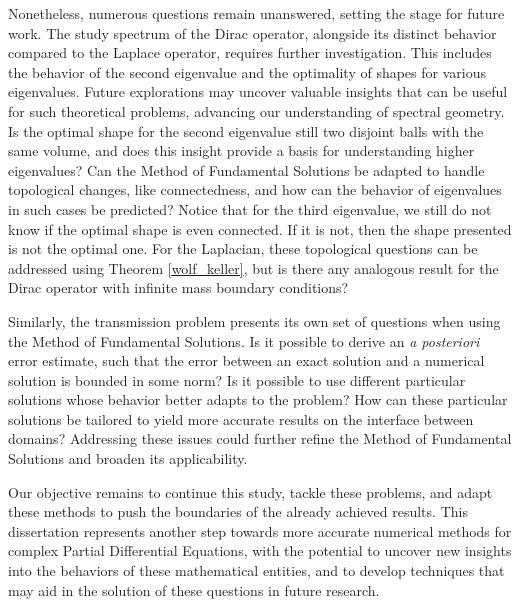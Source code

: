 Nonetheless, numerous questions remain unanswered, setting the stage for future work. The study spectrum of the Dirac operator, alongside its distinct behavior compared to the Laplace operator, requires further investigation. This includes the behavior of the second eigenvalue and the optimality of shapes for various eigenvalues. Future explorations may uncover valuable insights that can be useful for such theoretical problems, advancing our understanding of spectral geometry. Is the optimal shape for the second eigenvalue still two disjoint balls with the same volume, and does this insight provide a basis for understanding higher eigenvalues? Can the Method of Fundamental Solutions be adapted to handle topological changes, like connectedness, and how can the behavior of eigenvalues in such cases be predicted? Notice that for the third eigenvalue, we still do not know if the optimal shape is even connected. If it is not, then the shape presented is not the optimal one. For the Laplacian, these topological questions can be addressed using Theorem \ref{wolf_keller}, but is there any analogous result for the Dirac operator with infinite mass boundary conditions?

Similarly, the transmission problem presents its own set of questions when using the Method of Fundamental Solutions. Is it possible to derive an \textit{a posteriori} error estimate, such that the error between an exact solution and a numerical solution is bounded in some norm? Is it possible to use different particular solutions whose behavior better adapts to the problem? How can these particular solutions be tailored to yield more accurate results on the interface between domains? Addressing these issues could further refine the Method of Fundamental Solutions and broaden its applicability. 

Our objective remains to continue this study, tackle these problems, and adapt these methods to push the boundaries of the already achieved results. This dissertation represents another step towards more accurate numerical methods for complex Partial Differential Equations, with the potential to uncover new insights into the behaviors of these mathematical entities, and to develop techniques that may aid in the solution of these questions in future research.